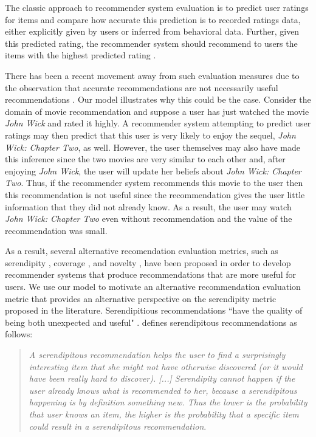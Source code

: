 \documentclass[sigconf]{acmart}
\begin{document}
The classic approach to recommender system evaluation is to predict user ratings for items and compare how accurate this prediction is to recorded ratings data, either explicitly given by users or inferred from behavioral data. Further, given this predicted rating, the recommender system should recommend to users the items with the highest predicted rating \cite{adomavicius2005toward}.

There has been a recent movement away from such evaluation measures due to the observation that accurate recommendations are not necessarily useful recommendations \cite{mcnee2006being}. Our model illustrates why this could be the case. Consider the domain of movie recommendation and suppose a user has just watched the movie \textit{John Wick} and rated it highly. A recommender system attempting to predict user ratings may then predict that this user is very likely to enjoy the sequel, \textit{John Wick: Chapter Two}, as well. However, the user themselves may also have made this inference since the two movies are very similar to each other and, after enjoying \textit{John Wick}, the user will update her beliefs about \textit{John Wick: Chapter Two}. Thus, if the recommender system recommends this movie to the user then this recommendation is not useful since the recommendation gives the user little information that they did not already know. As a result, the user may watch \textit{John Wick: Chapter Two} even without recommendation and the value of the recommendation was small.

As a result, several alternative recomendation evaluation metrics, such as serendipity \cite{kotkov2016survey}, coverage \cite{ge2010beyond}, and novelty \cite{vargas2011rank}, have been proposed in order to develop recommender systems that produce recommendations that are more useful for users. We use our model to motivate an alternative recommendation evaluation metric that provides an alternative perspective on the serendipity metric proposed in the literature. Serendipitious recommendations ``have the quality of being both unexpected and useful" \cite{maksai2015predicting}. \cite{iaquinta2010can} defines serendipitous recommendations as follows:
\begin{quote}
\textit{A serendipitous recommendation helps the
user to find a surprisingly interesting item that
she might not have otherwise discovered (or it
would have been really hard to discover). [...]
Serendipity cannot happen if the user already
knows what is recommended to her, because a
serendipitous happening is by definition something new. Thus the lower is the probability that user knows an item, the higher is the
probability that a specific item could result
in a serendipitous recommendation}.
\end{quote}
\end{document}
